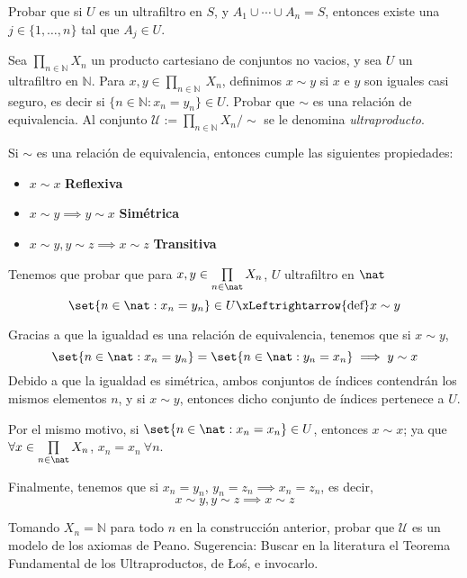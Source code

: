 \begin{problem}
Probar que si $U$ es un ultrafiltro en $S$, y  $A_1 \cup \cdots \cup A_n = S$, entonces existe una $j\in \{ 1, \dots, n\}$ tal que
$A_j\in U$.

\solution

\end{problem}

\begin{problem}
Sea  $\prod_{n\in \mathbb{N}} X_n$ un producto cartesiano de conjuntos no vacios, y sea $U$ un ultrafiltro en $\mathbb{N}$.
Para $x,y \in  \prod_{n\in \mathbb{N}}\ X_n$, definimos $x\sim y$ si $x$ e $y$ son iguales casi seguro, es
decir si $\{n\in \mathbb{N}: x_n = y_n\}\in U$. Probar que $\sim$ es una relación de equivalencia.
Al conjunto $\mathcal{U}:=\prod_{n\in \mathbb{N}} X_n/\sim$ se le denomina {\em ultraproducto}.

\solution

Si $\sim$ es una relación de equivalencia, entonces cumple las siguientes propiedades:
\begin{itemize}
	\item $x \sim x$ {\bf Reflexiva}
	\item $x \sim y \implies y \sim x$ {\bf Simétrica}
	\item $x \sim y, y \sim z \implies x \sim z$ {\bf Transitiva}
\end{itemize}

Tenemos que probar que para $x,y \in \prod\limits_{n \in \nat} X_n$, $U$ ultrafiltro en $\nat$
\[ \set{ n \in \nat : x_n = y_n} \in U \xLeftrightarrow{\text{def}} x \sim y \]

Gracias a que la igualdad es una relación de equivalencia, tenemos que si $x \sim y$,
\[\set{ n \in \nat : x_n = y_n} = \set{ n \in \nat : y_n = x_n} \implies y \sim x \]
Debido a que la igualdad es simétrica, ambos conjuntos de índices contendrán los mismos elementos $n$, y si $x\sim y$, entonces dicho conjunto de índices pertenece a $U$.

Por el mismo motivo, si $\set{ n \in \nat : x_n = x_n} \in U$, entonces $x \sim x$; ya que\\
$\forall x \in \prod\limits_{n \in \nat} X_n$, $x_n = x_n \ \forall n$.

Finalmente, tenemos que si $x_n = y_n$, $y_n = z_n \implies x_n = z_n$, es decir,
\[x \sim y, y \sim z \implies x \sim z\]

\end{problem}

\begin{problem}
Tomando $X_n = \mathbb{N}$ para todo $n$ en la construcción anterior, probar que $\mathcal{U}$ es un modelo de los axiomas de Peano. Sugerencia: Buscar en la literatura el Teorema Fundamental de los Ultraproductos, de {\L}o\'s, e invocarlo.

\solution

\end{problem}

